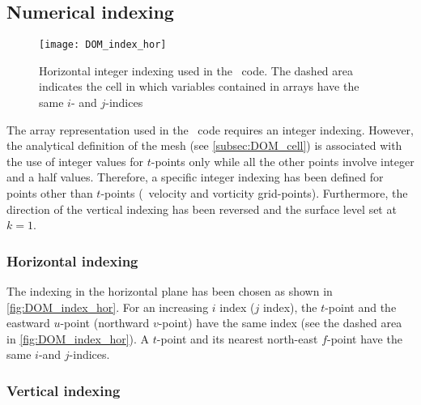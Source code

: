 \documentclass[../main/NEMO_manual]{subfiles}
\begin{document}
\subsection{Numerical indexing}
\label{subsec:DOM_Num_Index}

\begin{figure}
  \centering
  \texttt{[image: DOM\_index\_hor]}
  \caption[Horizontal integer indexing]{
    Horizontal integer indexing used in the \fortran\ code.
    The dashed area indicates the cell in which
    variables contained in arrays have the same $i$- and $j$-indices}
  \label{fig:DOM_index_hor}
\end{figure}

The array representation used in the \fortran\ code requires an integer indexing.
However, the analytical definition of the mesh (see \autoref{subsec:DOM_cell}) is associated with
the use of integer values for $t$-points only while
all the other points involve integer and a half values.
Therefore, a specific integer indexing has been defined for points other than $t$-points
(\ie\ velocity and vorticity grid-points).
Furthermore, the direction of the vertical indexing has been reversed and
the surface level set at $k = 1$.

\subsubsection{Horizontal indexing}
\label{subsec:DOM_Num_Index_hor}

The indexing in the horizontal plane has been chosen as shown in \autoref{fig:DOM_index_hor}.
For an increasing $i$ index ($j$ index),
the $t$-point and the eastward $u$-point (northward $v$-point) have the same index
(see the dashed area in \autoref{fig:DOM_index_hor}).
A $t$-point and its nearest north-east $f$-point have the same $i$-and $j$-indices.

\subsubsection{Vertical indexing}
\label{subsec:DOM_Num_Index_vertical}
\end{document}
